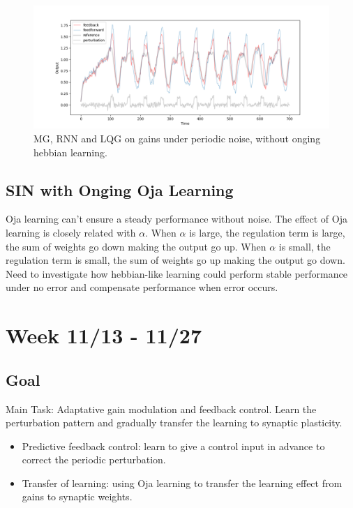 \documentclass[12pt, a4paper]{article}
\begin{document}
\begin{figure}[H]
    \centering
    \includegraphics[width=\textwidth]{analysis/fig/1113_MG_lqg.png}
    \caption{MG, RNN and LQG on gains under periodic noise, without onging hebbian learning.}
\end{figure}

\newpage

\subsection*{SIN with Onging Oja Learning}

Oja learning can't ensure a steady performance without noise. The effect of Oja learning is closely related with $\alpha$. When $\alpha$ is large, the regulation term is large, the sum of weights go down making the output go up. When $\alpha$ is small, the regulation term is small, the sum of weights go up making the output go down. Need to investigate how hebbian-like learning could perform stable performance under no error and compensate performance when error occurs.

\newpage


\section*{Week 11/13 - 11/27}

\subsection*{Goal}

\noindent
Main Task: Adaptative gain modulation and feedback control. Learn the perturbation pattern and gradually transfer the learning to synaptic plasticity.

\begin{itemize}
    \item Predictive feedback control: learn to give a control input in advance to correct the periodic perturbation.
    \item Transfer of learning: using Oja learning to transfer the learning effect from gains to synaptic weights.
\end{itemize}
\end{document}
